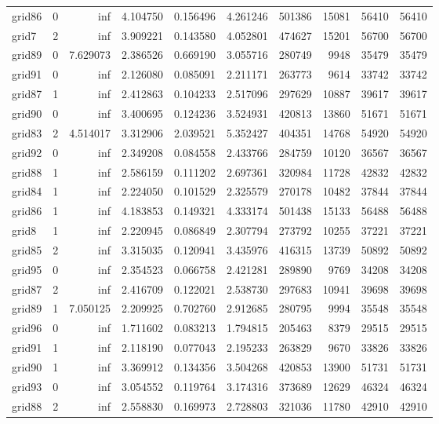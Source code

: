 \begin{longtable}{|l|r|r|r|r|r|r|r|r|r|}
grid86 & 0 & inf & 4.104750 & 0.156496 & 4.261246 & 501386 & 15081 & 56410 & 56410 \\
grid7 & 2 & inf & 3.909221 & 0.143580 & 4.052801 & 474627 & 15201 & 56700 & 56700 \\
grid89 & 0 & 7.629073 & 2.386526 & 0.669190 & 3.055716 & 280749 & 9948 & 35479 & 35479 \\
grid91 & 0 & inf & 2.126080 & 0.085091 & 2.211171 & 263773 & 9614 & 33742 & 33742 \\
grid87 & 1 & inf & 2.412863 & 0.104233 & 2.517096 & 297629 & 10887 & 39617 & 39617 \\
grid90 & 0 & inf & 3.400695 & 0.124236 & 3.524931 & 420813 & 13860 & 51671 & 51671 \\
grid83 & 2 & 4.514017 & 3.312906 & 2.039521 & 5.352427 & 404351 & 14768 & 54920 & 54920 \\
grid92 & 0 & inf & 2.349208 & 0.084558 & 2.433766 & 284759 & 10120 & 36567 & 36567 \\
grid88 & 1 & inf & 2.586159 & 0.111202 & 2.697361 & 320984 & 11728 & 42832 & 42832 \\
grid84 & 1 & inf & 2.224050 & 0.101529 & 2.325579 & 270178 & 10482 & 37844 & 37844 \\
grid86 & 1 & inf & 4.183853 & 0.149321 & 4.333174 & 501438 & 15133 & 56488 & 56488 \\
grid8 & 1 & inf & 2.220945 & 0.086849 & 2.307794 & 273792 & 10255 & 37221 & 37221 \\
grid85 & 2 & inf & 3.315035 & 0.120941 & 3.435976 & 416315 & 13739 & 50892 & 50892 \\
grid95 & 0 & inf & 2.354523 & 0.066758 & 2.421281 & 289890 & 9769 & 34208 & 34208 \\
grid87 & 2 & inf & 2.416709 & 0.122021 & 2.538730 & 297683 & 10941 & 39698 & 39698 \\
grid89 & 1 & 7.050125 & 2.209925 & 0.702760 & 2.912685 & 280795 & 9994 & 35548 & 35548 \\
grid96 & 0 & inf & 1.711602 & 0.083213 & 1.794815 & 205463 & 8379 & 29515 & 29515 \\
grid91 & 1 & inf & 2.118190 & 0.077043 & 2.195233 & 263829 & 9670 & 33826 & 33826 \\
grid90 & 1 & inf & 3.369912 & 0.134356 & 3.504268 & 420853 & 13900 & 51731 & 51731 \\
grid93 & 0 & inf & 3.054552 & 0.119764 & 3.174316 & 373689 & 12629 & 46324 & 46324 \\
grid88 & 2 & inf & 2.558830 & 0.169973 & 2.728803 & 321036 & 11780 & 42910 & 42910 \\

\end{longtable}
